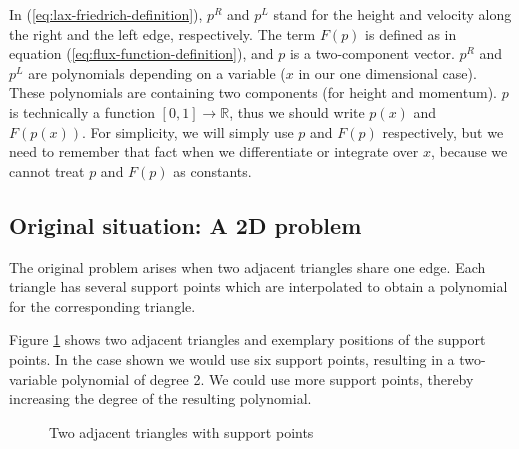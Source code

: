 \documentclass{article}
\newcommand{\reals}{\mathbb{R}}
\begin{document}
In (\ref{eq:lax-friedrich-definition}), $p^R$ and $p^L$ stand for the height and velocity along the right and the left edge, respectively. The term $F(p)$ is defined as in equation (\ref{eq:flux-function-definition}), and $p$ is a two-component vector. $p^R$ and $p^L$ are polynomials depending on a variable ($x$ in our one dimensional case). These polynomials are containing two components (for height and momentum). $p$ is technically a function $[0,1]\rightarrow\reals$, thus we should write $p\left(x\right)$ and $F\left(p\left(x\right)\right)$. For simplicity, we will simply use $p$ and $F\left(p\right)$ respectively, but we need to remember that fact when we differentiate or integrate over $x$, because we cannot treat $p$ and $F\left(p\right)$ as constants.

\subsection{Original situation: A 2D problem}
\label{sec:original-situation-2d-problem}

The original problem arises when two adjacent triangles share one edge. Each triangle has several support points which are interpolated to obtain a polynomial for the corresponding triangle.

Figure \ref{fig:two-triangles-and-some-support-points} shows two adjacent triangles and exemplary positions of the support points. In the case shown we would use six support points, resulting in a two-variable polynomial of degree 2. We could use more support points, thereby increasing the degree of the resulting polynomial.

\begin{figure}[h]
  \centering
  \caption{Two adjacent triangles with support points}
  \label{fig:two-triangles-and-some-support-points}
\end{figure}
\end{document}
